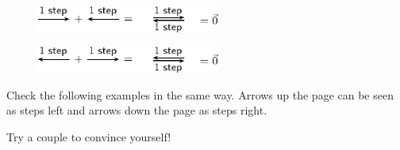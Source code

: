     \setcounter{subfigure}{0}


	\begin{figure}[H] %
    \begin{center}
    \label{m38813*id186710!!!underscore!!!media}\label{m38813*id186710!!!underscore!!!printimage}\includegraphics[width=6cm]{col11305.imgs/m38813_PG11C1_016.png} %
        
      \vspace{2pt}
    \vspace{.1in}
    
    \end{center}

 \end{figure}   

    \addtocounter{footnote}{-0}
    
        \par 
        \label{m38813*id186716}
          
    \setcounter{subfigure}{0}


	\begin{figure}[H] %
    \begin{center}
    \label{m38813*id188625!!!underscore!!!media}\label{m38813*id188625!!!underscore!!!printimage}\includegraphics[width=6cm]{col11305.imgs/m38813_PG11C1_017.png} %
        
      \vspace{2pt}
    \vspace{.1in}
    
    \end{center}

 \end{figure}   

    \addtocounter{footnote}{-0}
    
        \par 
        \label{m38813*id188632}Check the following examples in the same way. Arrows up the page can be
seen as steps left and arrows down the page as steps right.\par 
        \label{m38813*id188636}Try a couple to convince yourself!\par \nopagebreak
        
